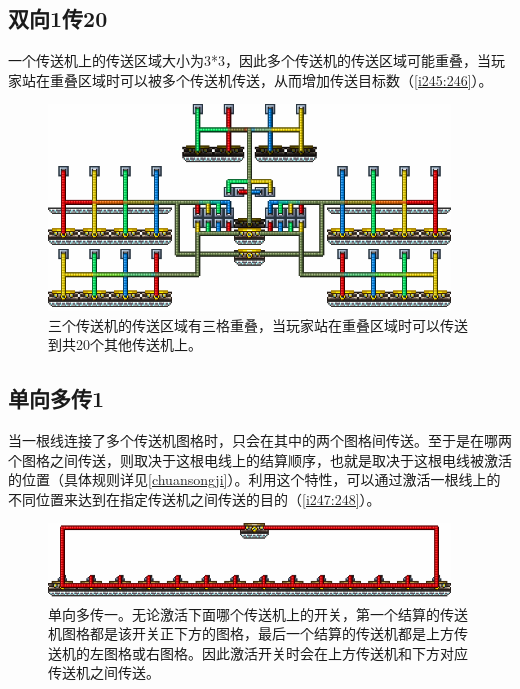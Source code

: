 \subsection{双向1传20}\label{sec12}
一个传送机上的传送区域大小为3*3，因此多个传送机的传送区域可能重叠，当玩家站在重叠区域时可以被多个传送机传送，从而增加传送目标数（\autoref{i245:246}）。

\begin{figure}[!ht]
\centering
\includegraphics[width=0.95\textwidth]{images/246.png}
\caption{三个传送机的传送区域有三格重叠，当玩家站在重叠区域时可以传送到共20个其他传送机上。}
\label{i245:246}
\end{figure}

\subsection{单向多传1}\label{sec13}
当一根线连接了多个传送机图格时，只会在其中的两个图格间传送。至于是在哪两个图格之间传送，则取决于这根电线上的结算顺序，也就是取决于这根电线被激活的位置（具体规则详见\autoref{chuansongji}）。利用这个特性，可以通过激活一根线上的不同位置来达到在指定传送机之间传送的目的（\autoref{i247:248}）。

\begin{figure}[!ht]
\centering
\includegraphics[width=0.95\textwidth]{images/248.png}
\caption{单向多传一。无论激活下面哪个传送机上的开关，第一个结算的传送机图格都是该开关正下方的图格，最后一个结算的传送机都是上方传送机的左图格或右图格。因此激活开关时会在上方传送机和下方对应传送机之间传送。}
\label{i247:248}
\end{figure}

